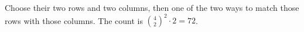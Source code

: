 Choose their two rows and two columns, then one of the two ways to match those rows with those columns. The count is $\binom42^2\cdot2=\boxed{72}$.
